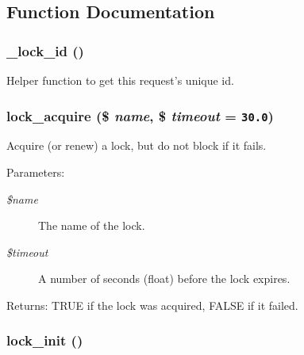 \subsection{Function Documentation}
\hypertarget{group__lock_g22f64c6b65bc54d5f8f981559b0cdf04}{
\subsubsection[{\_\-lock\_\-id}]{\setlength{\rightskip}{0pt plus 5cm}\_\-lock\_\-id ()}}
\label{group__lock_g22f64c6b65bc54d5f8f981559b0cdf04}


Helper function to get this request's unique id. \hypertarget{group__lock_gc67a4b1061491f7a869646f47b66e998}{
\subsubsection[{lock\_\-acquire}]{\setlength{\rightskip}{0pt plus 5cm}lock\_\-acquire (\$ {\em name}, \/  \$ {\em timeout} = {\tt 30.0})}}
\label{group__lock_gc67a4b1061491f7a869646f47b66e998}


Acquire (or renew) a lock, but do not block if it fails.

\begin{Desc}
\item[Parameters:]
\begin{description}
\item[{\em \$name}]The name of the lock. \item[{\em \$timeout}]A number of seconds (float) before the lock expires. \end{description}
\end{Desc}
\begin{Desc}
\item[Returns:]TRUE if the lock was acquired, FALSE if it failed. \end{Desc}
\hypertarget{group__lock_g0d77cf7fc006fdcf8965ae2b682f90b9}{
\subsubsection[{lock\_\-init}]{\setlength{\rightskip}{0pt plus 5cm}lock\_\-init ()}}
\label{group__lock_g0d77cf7fc006fdcf8965ae2b682f90b9}


